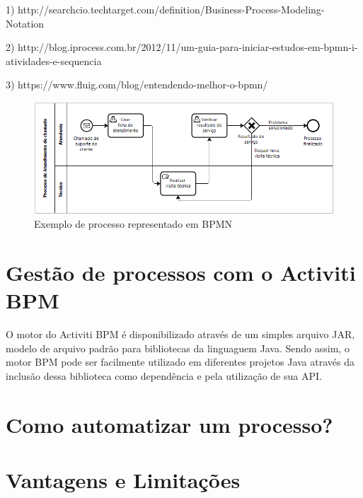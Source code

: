1) http://searchcio.techtarget.com/definition/Business-Process-Modeling-Notation

2) http://blog.iprocess.com.br/2012/11/um-guia-para-iniciar-estudos-em-bpmn-i-atividades-e-sequencia

3) https://www.fluig.com/blog/entendendo-melhor-o-bpmn/

\begin{figure}
  \centering
  \includegraphics[width=1.0\textwidth]{imagens/bpmn_example.png}
  \caption{Exemplo de processo representado em BPMN}
  \label{fig:exemplo_bpmn}
\end{figure}

\section{Gestão de processos com o Activiti BPM}\label{sec:activiti-gestao_processos}

O motor do Activiti BPM é disponibilizado através de um simples arquivo JAR, modelo de arquivo padrão para bibliotecas da linguaguem Java. Sendo assim, o motor BPM pode ser facilmente utilizado em diferentes projetos Java através da inclusão dessa biblioteca como dependência e pela utilização de sua API.
\section{Como automatizar um processo?}\label{sec:activiti-automatizar_processo}

\section{Vantagens e Limitações}\label{sec:activiti-vantages_limitacoes}



